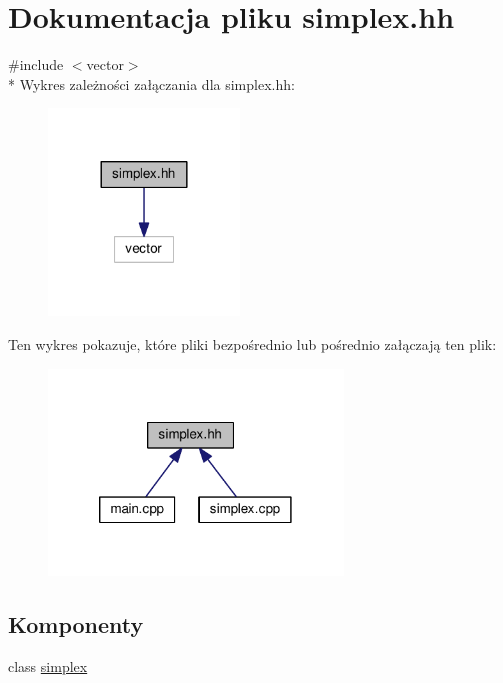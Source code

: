 \hypertarget{simplex_8hh}{\section{Dokumentacja pliku simplex.\-hh}
\label{simplex_8hh}
}
{\ttfamily \#include $<$vector$>$}\\*
Wykres zależności załączania dla simplex.\-hh\-:
\nopagebreak
\begin{figure}[H]
\begin{center}
\leavevmode
\includegraphics[width=144pt]{simplex_8hh__incl}
\end{center}
\end{figure}
Ten wykres pokazuje, które pliki bezpośrednio lub pośrednio załączają ten plik\-:
\nopagebreak
\begin{figure}[H]
\begin{center}
\leavevmode
\includegraphics[width=222pt]{simplex_8hh__dep__incl}
\end{center}
\end{figure}
\subsection*{Komponenty}
\begin{DoxyCompactItemize}
\item 
class \hyperlink{classsimplex}{simplex}
\end{DoxyCompactItemize}

